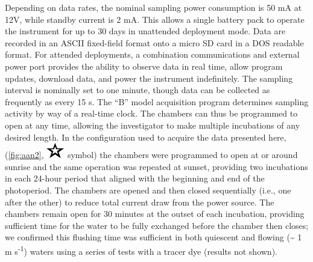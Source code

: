 Depending on data rates, the nominal sampling power consumption is 50 mA at 12V, while standby current is 2 mA. This allows a single battery pack to operate the instrument for up to 30 days in unattended deployment mode. Data are recorded in an ASCII fixed-field format onto a micro SD card in a DOS readable format. For attended deployments, a combination communications and external power port provides the ability to observe data in real time, allow program updates, download data, and power the instrument indefinitely. The sampling interval is nominally set to one minute, though data can be collected as frequently as every 15 s. The ``B'' model acquisition program determines sampling activity by way of a real-time clock. The chambers can thus be programmed to open at any time, allowing the investigator to make multiple incubations of any desired length. In the configuration used to acquire the data presented here, (\autoref{fig:aan2}, \includegraphics[height=\fontcharht\font`\B]{images/Fig_A-Inline2.pdf} symbol) the chambers were programmed to open at or around sunrise and the same operation was repeated at sunset, providing two incubations in each 24-hour period that aligned with the beginning and end of the photoperiod. The chambers are opened and then closed sequentially (i.e., one after the other) to reduce total current draw from the power source. The chambers remain open for 30 minutes at the outset of each incubation, providing sufficient time for the water to be fully exchanged before the chamber then closes; we confirmed this flushing time was sufficient in both quiescent and flowing (\textasciitilde{} 1 m s\textsuperscript{-1}) waters using a series of tests with a tracer dye (results not shown).
